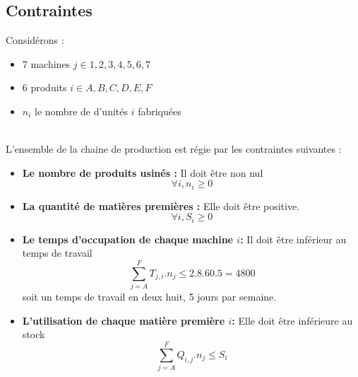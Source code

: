 \subsection{Contraintes}
Considérons :
\begin{itemize}
  \item 7 machines $j \in {1, 2, 3, 4, 5, 6 ,7}$
  \item 6 produits $i \in {A, B, C, D, E, F}$
  \item $n_i$ le nombre de d'unités $i$ fabriquées
\end{itemize}
~\\
L'ensemble de la chaine de production est régie par les contraintes suivantes
:\\
\begin{itemize}
  \item \textbf{Le nombre de produits usinés :} Il doit être non nul
  \begin{equation} 
  	\forall i, n_i \ge 0 \label{C0}
  \end{equation}
  
  \item \textbf{La quantité de matières premières :} Elle doit
  être positive.
  \begin{equation} 
  	\forall i, S_i \ge 0 \label{C0}
  \end{equation}
  
  \item \textbf{Le temps d'occupation de chaque machine $i$:} Il doit être
  inférieur au temps de travail
  \begin{equation} 
  	\sum_{j = A}^{F} T_{j,i} . n_j \leq 2.8.60.5 = 4800 \label{C1}
  \end{equation} 
  soit un temps de travail en deux huit, 5 jours par semaine.
  
  \item \textbf{L'utilisation de chaque matière première  $i$:} Elle doit être
  inférieure au stock
  \begin{equation} 
  	\sum_{j = A}^{F} Q_{i,j} . n_j \leq S_i \label{C2}
  \end{equation} 
\end{itemize}



